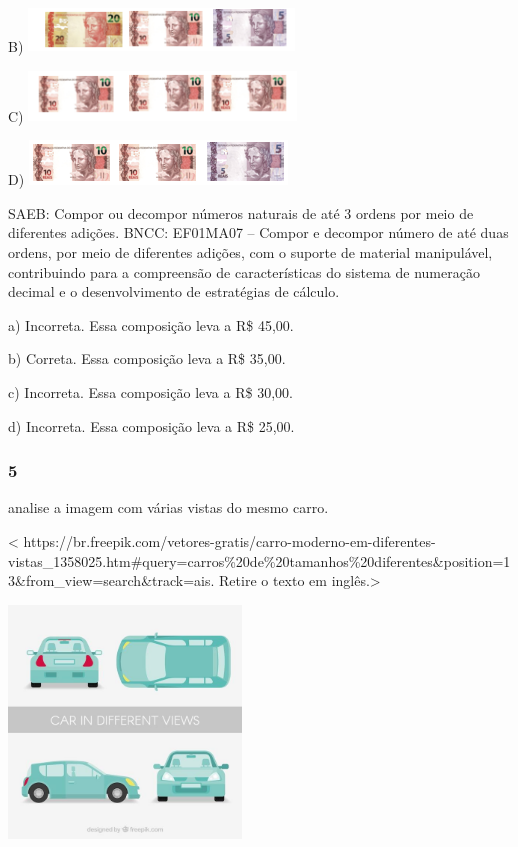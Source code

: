 \begin{itemize}
\begin{itemize}
B)
\includegraphics[width=2.78164in,height=0.46882in]{media/image142.png}

C)
\includegraphics[width=2.80247in,height=0.53132in]{media/image144.png}

D)
\includegraphics[width=2.69829in,height=0.46882in]{media/image145.png}

SAEB: Compor ou decompor números naturais de até 3 ordens por meio
de diferentes adições.
BNCC: EF01MA07 -- Compor e decompor número de até duas ordens, por meio
de diferentes adições, com o suporte de material manipulável,
contribuindo para a compreensão de características do sistema de
numeração decimal e o desenvolvimento de estratégias de cálculo.

a) Incorreta. Essa composição leva a R\$ 45,00.

b) Correta. Essa composição leva a R\$ 35,00.

c) Incorreta. Essa composição leva a R\$ 30,00.

d) Incorreta. Essa composição leva a R\$ 25,00.

\subsubsection{5}\label{section-121}

analise a imagem com várias vistas do mesmo carro.

\textless{}
https://br.freepik.com/vetores-gratis/carro-moderno-em-diferentes-vistas\_1358025.htm\#query=carros\%20de\%20tamanhos\%20diferentes\&position=13\&from\_view=search\&track=ais.
Retire o texto em inglês.\textgreater{}

\includegraphics[width=2.43750in,height=2.43750in]{media/image146.jpg}


\end{itemize}
\end{itemize}
